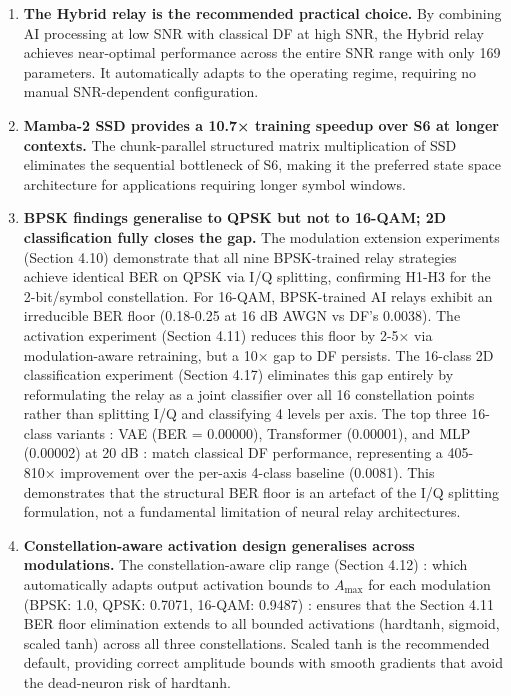 \begin{enumerate}
  \textbf{MMSE-SIC provides the best MIMO equalization.} The non-linear SIC technique consistently outperforms both ZF and MMSE for all relay types, confirming the benefit of successive interference cancellation in the spatial multiplexing setting. The equalization gains are additive to the relay processing gains.
\item
  \textbf{The Hybrid relay is the recommended practical choice.} By combining AI processing at low SNR with classical DF at high SNR, the Hybrid relay achieves near-optimal performance across the entire SNR range with only 169 parameters. It automatically adapts to the operating regime, requiring no manual SNR-dependent configuration.
\item
  \textbf{Mamba-2 SSD provides a 10.7× training speedup over S6 at longer contexts.} The chunk-parallel structured matrix multiplication of SSD eliminates the sequential bottleneck of S6, making it the preferred state space architecture for applications requiring longer symbol windows.
\item
  \textbf{BPSK findings generalise to QPSK but not to 16-QAM; 2D classification fully closes the gap.} The modulation extension experiments (Section 4.10) demonstrate that all nine BPSK-trained relay strategies achieve identical BER on QPSK via I/Q splitting, confirming H1-H3 for the 2-bit/symbol constellation. For 16-QAM, BPSK-trained AI relays exhibit an irreducible BER floor (0.18-0.25 at 16 dB AWGN vs DF's 0.0038). The activation experiment (Section 4.11) reduces this floor by 2-5× via modulation-aware retraining, but a 10× gap to DF persists. The 16-class 2D classification experiment (Section 4.17) eliminates this gap entirely by reformulating the relay as a joint classifier over all 16 constellation points rather than splitting I/Q and classifying 4 levels per axis. The top three 16-class variants : VAE (BER = 0.00000), Transformer (0.00001), and MLP (0.00002) at 20 dB : match classical DF performance, representing a 405-810× improvement over the per-axis 4-class baseline (0.0081). This demonstrates that the structural BER floor is an artefact of the I/Q splitting formulation, not a fundamental limitation of neural relay architectures.
\item
  \textbf{Constellation-aware activation design generalises across modulations.} The constellation-aware clip range (Section 4.12) : which automatically adapts output activation bounds to \(A_{\max}\) for each modulation (BPSK: 1.0, QPSK: 0.7071, 16-QAM: 0.9487) : ensures that the Section 4.11 BER floor elimination extends to all bounded activations (hardtanh, sigmoid, scaled tanh) across all three constellations. Scaled tanh is the recommended default, providing correct amplitude bounds with smooth gradients that avoid the dead-neuron risk of hardtanh.

\end{enumerate}
